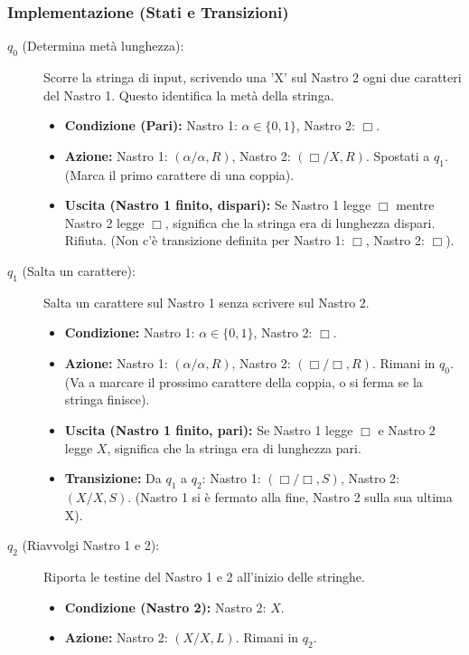 \documentclass[a4paper, 11pt]{book} %
\theoremstyle{definition}
\begin{document}
\subsubsection{Implementazione (Stati e Transizioni)}
\begin{description}
    \item[$q_0$ (Determina metà lunghezza):] Scorre la stringa di input, scrivendo una 'X' sul Nastro 2 ogni due caratteri del Nastro 1. Questo identifica la metà della stringa.
    \begin{itemize}
        \item \textbf{Condizione (Pari):} Nastro 1: $\alpha \in \{0,1\}$, Nastro 2: $\Box$.
        \item \textbf{Azione:} Nastro 1: $(\alpha/\alpha, R)$, Nastro 2: $(\Box/X, R)$. Spostati a $q_1$. (Marca il primo carattere di una coppia).
        \item \textbf{Uscita (Nastro 1 finito, dispari):} Se Nastro 1 legge $\Box$ mentre Nastro 2 legge $\Box$, significa che la stringa era di lunghezza dispari. Rifiuta. (Non c'è transizione definita per Nastro 1: $\Box$, Nastro 2: $\Box$).
    \end{itemize}
    \item[$q_1$ (Salta un carattere):] Salta un carattere sul Nastro 1 senza scrivere sul Nastro 2.
    \begin{itemize}
        \item \textbf{Condizione:} Nastro 1: $\alpha \in \{0,1\}$, Nastro 2: $\Box$.
        \item \textbf{Azione:} Nastro 1: $(\alpha/\alpha, R)$, Nastro 2: $(\Box/\Box, R)$. Rimani in $q_0$. (Va a marcare il prossimo carattere della coppia, o si ferma se la stringa finisce).
        \item \textbf{Uscita (Nastro 1 finito, pari):} Se Nastro 1 legge $\Box$ e Nastro 2 legge $X$, significa che la stringa era di lunghezza pari.
        \item \textbf{Transizione:} Da $q_1$ a $q_2$: Nastro 1: $(\Box/\Box, S)$, Nastro 2: $(X/X, S)$. (Nastro 1 si è fermato alla fine, Nastro 2 sulla sua ultima X).
    \end{itemize}
    \item[$q_2$ (Riavvolgi Nastro 1 e 2):] Riporta le testine del Nastro 1 e 2 all'inizio delle stringhe.
    \begin{itemize}
        \item \textbf{Condizione (Nastro 2):} Nastro 2: $X$.
        \item \textbf{Azione:} Nastro 2: $(X/X, L)$. Rimani in $q_2$.

\end{itemize}
\end{description}
\end{document}
